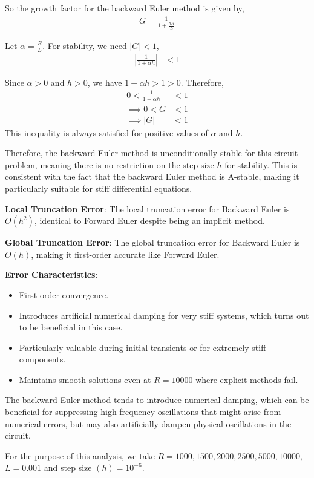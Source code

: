 \documentclass[12pt]{article}
\newcommand{\brak}[1]{\ensuremath{\left(#1\right)}}
\newcommand{\abs}[1]{\left\vert#1\right\vert}
\begin{document}
So the growth factor for the backward Euler method is given by,
\begin{align*}
G = \frac{1}{1 + \frac{hR}{L}}
\end{align*}

Let $\alpha = \frac{R}{L}$. For stability, we need $|G| < 1$,
\begin{align*}
\left|\frac{1}{1 + \alpha h}\right| &< 1
\end{align*}

Since $\alpha > 0$ and $h > 0$, we have $1 + \alpha h > 1 > 0$. Therefore,
\begin{align*}
0 < \frac{1}{1 + \alpha h} &< 1\\
\implies 0 < G &< 1\\
\implies \abs{G} &< 1
\end{align*}
This inequality is always satisfied for positive values of $\alpha$ and $h$.

Therefore, the backward Euler method is unconditionally stable for this circuit problem, meaning there is no restriction on the step size $h$ for stability. This is consistent with the fact that the backward Euler method is A-stable, making it particularly suitable for stiff differential equations.

\textbf{Local Truncation Error}: The local truncation error for Backward Euler is $O(h^2)$, identical to Forward Euler despite being an implicit method.

\textbf{Global Truncation Error}: The global truncation error for Backward Euler is $O(h)$, making it first-order accurate like Forward Euler.

\textbf{Error Characteristics}:
\begin{itemize}
\item First-order convergence.
\item Introduces artificial numerical damping for very stiff systems, which turns out to be beneficial in this case.
\item Particularly valuable during initial transients or for extremely stiff components.
\item Maintains smooth solutions even at $R = 10000$ where explicit methods fail.
\end{itemize}
The backward Euler method tends to introduce numerical damping, which can be beneficial for suppressing high-frequency oscillations that might arise from numerical errors, but may also artificially dampen physical oscillations in the circuit.

For the purpose of this analysis, we take $R = 1000, 1500, 2000, 2500, 5000, 10000$, $L = 0.001$ and step size $\brak{h} = 10^{-6}$.\newline
\end{document}
